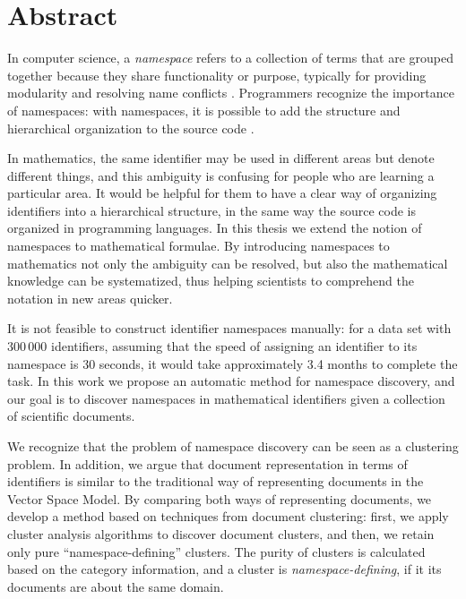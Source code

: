 \section*{Abstract}

In computer science, a \emph{namespace} refers to a collection of
terms that are grouped together because they share functionality or
purpose, typically for providing modularity and resolving name conflicts
\cite{duval2002metadata}.
Programmers recognize the importance of namespaces: with namespaces, it is 
possible to add the structure and hierarchical organization to the source code
\cite{mcarthur2008php6}.

In mathematics, the same identifier may be used in different areas
but denote different things, and this
ambiguity is confusing for people who are learning a particular 
area. It would be helpful for them to have a clear way of organizing 
identifiers into a hierarchical structure, in the same way the source 
code is organized in programming languages.
In this thesis we extend the notion of namespaces to mathematical formulae.
By introducing namespaces to mathematics not only the ambiguity can be resolved, 
but also the mathematical knowledge can be systematized,
thus helping scientists to comprehend the notation in new areas quicker. 

It is not feasible to construct identifier namespaces manually:
for a data set with 300\,000 identifiers, assuming that the speed of 
assigning an identifier to its namespace is 30 seconds,
it would take approximately 3.4 months to complete the task.
In this work we propose an automatic method for namespace discovery, and our goal 
is to discover namespaces in mathematical identifiers given a collection of scientific 
documents.

We recognize that the problem of namespace discovery can be seen as a 
clustering problem.
In addition, we argue that document representation in terms of identifiers is similar to the 
traditional way of representing documents in the Vector Space Model. 
By comparing both ways of representing documents, we develop a method based 
on techniques from document clustering: first, we apply cluster analysis algorithms 
to discover document clusters, and then, we retain only pure ``namespace-defining'' clusters.
The purity of clusters is calculated based on the category information, and a 
cluster is \emph{namespace-defining}, if it its documents are about the same domain. 

